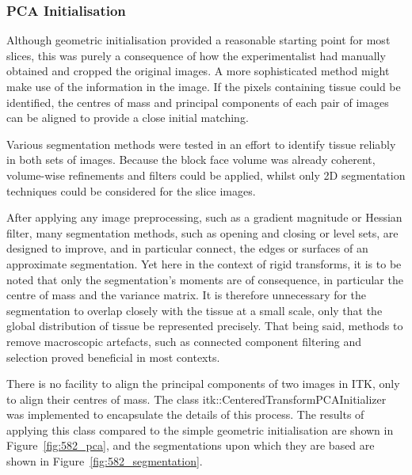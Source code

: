 		\subsubsection{PCA Initialisation} %
		\label{ssub:pca_initialisation}
			Although geometric initialisation provided a reasonable starting point for most slices, this was purely a consequence of how the experimentalist had manually obtained and cropped the original images. A more sophisticated method might make use of the information in the image. If the pixels containing tissue could be identified, the centres of mass and principal components of each pair of images can be aligned to provide a close initial matching.
		
		  Various segmentation methods were tested in an effort to identify tissue reliably in both sets of images. Because the block face volume was already coherent, volume-wise refinements and filters could be applied, whilst only 2D segmentation techniques could be considered for the slice images.
			
			After applying any image preprocessing, such as a gradient magnitude or Hessian filter, many segmentation methods, such as opening and closing or level sets, are designed to improve, and in particular connect, the edges or surfaces of an approximate segmentation. Yet here in the context of rigid transforms, it is to be noted that only the segmentation's moments are of consequence, in particular the centre of mass and the variance matrix. It is therefore unnecessary for the segmentation to overlap closely with the tissue at a small scale, only that the global distribution of tissue be represented precisely. That being said, methods to remove macroscopic artefacts, such as connected component filtering and selection proved beneficial in most contexts.
			
		  There is no facility to align the principal components of two images in ITK, only to align their centres of mass. The class itk::CenteredTransformPCAInitializer was implemented to encapsulate the details of this process. The results of applying this class compared to the simple geometric initialisation are shown in Figure~\ref{fig:582_pca}, and the segmentations upon which they are based are shown in Figure~\ref{fig:582_segmentation}.
		
